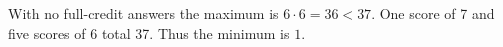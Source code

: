 With no full-credit answers the maximum is $6\cdot6=36<37$. One score of 7 and five scores of 6 total 37. Thus the minimum is $\boxed1$.
